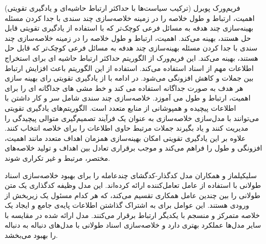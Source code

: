 فریم‌ورک پوبرل
(ترکیب سیاست‌ها با حداکثر ارتباط حاشیه‌ای و یادگیری تقویتی) اهمیت، ارتباط و طول خلاصه را در زمینه خلاصه‌سازی چند سندی با جدا کردن مسئله بهینه‌سازی چند هدفه به مسائل فرعی کوچک‌تر که با استفاده از یادگیری تقویتی قابل حل هستند، بهینه می‌کند. 
اهمیت، ارتباط و طول خلاصه را در زمینه خلاصه‌سازی چند سندی با جدا کردن مسئله بهینه‌سازی چند هدفه به مسائل فرعی کوچک‌تر که قابل حل هستند، بهینه می‌کند.
این فریم‌ورک از الگوریتم حداکثر ارتباط حاشیه ای
برای استخراج اطلاعات مهم از اسناد استفاده می‌کند. استفاده از این الگوریتم باعث افزایش ارتباط بین  جملات و کاهش افزونگی می‌شود.
در ادامه با از یادگیری تقویتی رای بهینه سازی هر هدف به صورت جداگانه استفاده می کند و خط مشی های جداگانه ای را برای اهمیت، ارتباط و طول می آموزد\cite{PoBRL}.
خلاصه‌سازی چند سندی شامل سر و کار داشتن با اطلاعات پیچیده و همپوشانی از منابع متعدد است. الگوریتم‌های یادگیری تقویتی می‌توانند با مدل‌سازی خلاصه‌سازی به عنوان یک فرآیند تصمیم‌گیری متوالی  پیچیدگی را مدیریت کنند و یاد بگیرند جملات مرتبط حاوی اطلاعات را برای خلاصه انتخاب کنند. علاوه بر این  یادگیری تقویتی امکان بهینه‌سازی همزمان اهداف متعدد مانند اهمیت، افزونگی و طول را فراهم می‌کند و موجب برقراری تعادل بین اهداف و تولید خلاصه‌‌های مختصر، مرتبط و غیر تکراری شوند.

سلیکیلماز
و همکاران مدل کدگذار-کدگشای چندعامله را برای بهبود خلاصه‌سازی اسناد طولانی با استفاده از عامل تعامل‌کننده
ارائه کرده‌اند. این مدل وظیفه کدگذاری یک متن طولانی را بین چندین عامل همکاری تقسیم می‌کند، که هر کدام مسئول یک زیربخش از ورودی هستند. این عوامل برای به اشتراک گذاشتن اطلاعات پایه‌ی جامع و ایجاد یک خلاصه متمرکز و منسجم با یکدیگر ارتباط برقرار می‌کنند.  مدل ارائه شده در مقایسه با سایر مدل‌ها عملکرد بهتری دارد و خلاصه‌سازی اسناد طولانی با مدل‌های دنباله به دنباله را بهبود می‌بخشد.
